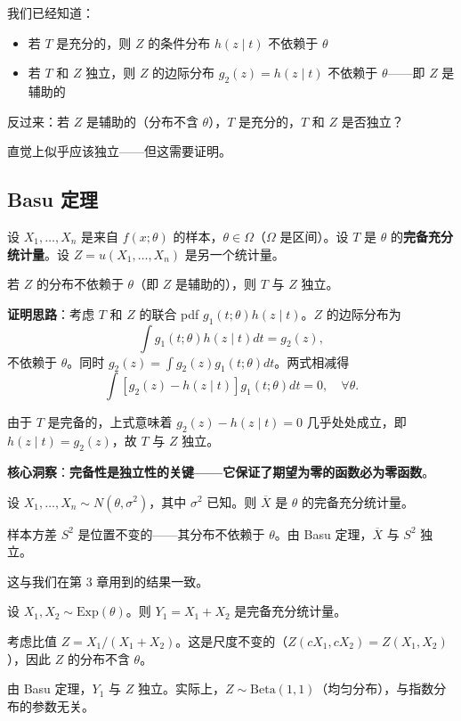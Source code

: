 我们已经知道：
\begin{itemize}
\item 若 $T$ 是充分的，则 $Z$ 的条件分布 $h(z \mid t)$ 不依赖于 $\theta$
\item 若 $T$ 和 $Z$ 独立，则 $Z$ 的边际分布 $g_2(z) = h(z \mid t)$ 不依赖于 $\theta$——即 $Z$ 是辅助的
\end{itemize}

反过来：若 $Z$ 是辅助的（分布不含 $\theta$），$T$ 是充分的，$T$ 和 $Z$ 是否独立？

直觉上似乎应该独立——但这需要证明。

\subsection{Basu 定理}

\begin{theorem}[Basu 定理]\label{th:basu}
设 $X_1, \ldots, X_n$ 是来自 $f(x; \theta)$ 的样本，$\theta \in \Omega$（$\Omega$ 是区间）。设 $T$ 是 $\theta$ 的\textbf{完备充分统计量}。设 $Z = u(X_1, \ldots, X_n)$ 是另一个统计量。

若 $Z$ 的分布不依赖于 $\theta$（即 $Z$ 是辅助的），则 $T$ 与 $Z$ 独立。
\end{theorem}

\textbf{证明思路}：考虑 $T$ 和 $Z$ 的联合 pdf $g_1(t; \theta)h(z \mid t)$。$Z$ 的边际分布为
\[
\int g_1(t; \theta)h(z \mid t) dt = g_2(z),
\]
不依赖于 $\theta$。同时 $g_2(z) = \int g_2(z)g_1(t; \theta) dt$。两式相减得
\[
\int [g_2(z) - h(z \mid t)] g_1(t; \theta) dt = 0,\quad \forall \theta.
\]

由于 $T$ 是完备的，上式意味着 $g_2(z) - h(z \mid t) = 0$ 几乎处处成立，即 $h(z \mid t) = g_2(z)$，故 $T$ 与 $Z$ 独立。

\textbf{核心洞察}：\textbf{完备性是独立性的关键——它保证了期望为零的函数必为零函数}。

\begin{example}\label{ex:normal-xbar-s2}
设 $X_1, \ldots, X_n \sim N(\theta, \sigma^2)$，其中 $\sigma^2$ 已知。则 $\overline{X}$ 是 $\theta$ 的完备充分统计量。

样本方差 $S^2$ 是位置不变的——其分布不依赖于 $\theta$。由 Basu 定理，$\overline{X}$ 与 $S^2$ 独立。

这与我们在第 3 章用到的结果一致。
\end{example}

\begin{example}\label{ex:exp-ancillary}
设 $X_1, X_2 \sim \text{Exp}(\theta)$。则 $Y_1 = X_1 + X_2$ 是完备充分统计量。

考虑比值 $Z = X_1/(X_1+X_2)$。这是尺度不变的（$Z(cX_1, cX_2) = Z(X_1, X_2)$），因此 $Z$ 的分布不含 $\theta$。

由 Basu 定理，$Y_1$ 与 $Z$ 独立。实际上，$Z \sim \text{Beta}(1,1)$（均匀分布），与指数分布的参数无关。
\end{example}

